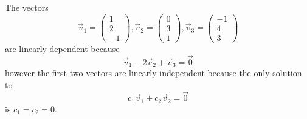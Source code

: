     \begin{ex}
        The vectors
            \[  \vec{v}_1 = \begin{pmatrix}1\\2\\-1\end{pmatrix}, 
                \vec{v}_2 = \begin{pmatrix}0\\3\\1\end{pmatrix}, 
                \vec{v}_3 = \begin{pmatrix}-1\\4\\3\end{pmatrix} \]
        are linearly dependent because
            \[ \vec{v}_1 - 2\vec{v}_2 + \vec{v}_3 = \vec{0} \]
        however the first two vectors are linearly independent because the only solution to
            \[ c_1 \vec{v}_1 + c_2 \vec{v}_2 = \vec{0} \]
        is $c_1 = c_2 = 0$.
    \end{ex}

